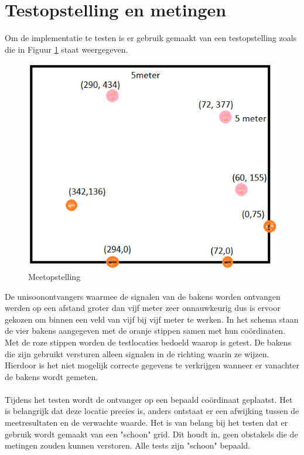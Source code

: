 \documentclass{article}
\begin{document}
\section{Testopstelling en metingen}
Om de implementatie te testen is er gebruik gemaakt van een testopstelling zoals die in Figuur \ref{Meetopstelling} staat weergegeven.
\begin{figure}[h] 
\centering\includegraphics[scale=0.5]{Meetopstelling.png}
\caption{Meetopstelling}
\label{Meetopstelling}
\end{figure}
De unisoonontvangers waarmee de signalen van de bakens worden ontvangen werden op een afstand groter dan vijf meter zeer onnauwkeurig dus is ervoor gekozen om binnen een veld van vijf bij vijf meter te werken. In het schema staan de vier bakens aangegeven met de oranje stippen samen met hun co\"{o}rdinaten. Met de roze stippen worden de testlocaties bedoeld waarop is getest. De bakens die zijn gebruikt versturen alleen signalen in de richting waarin ze wijzen. Hierdoor is het niet mogelijk correcte gegevens te verkrijgen wanneer er vanachter de bakens wordt gemeten. \\
\\
Tijdens het testen wordt de ontvanger op een bepaald co\"{o}rdinaat geplaatst. Het is belangrijk dat deze locatie precies is, anders ontstaat er een afwijking tussen de meetresultaten en de verwachte waarde. 
Het is van belang bij het testen dat er gebruik wordt gemaakt van een "schoon" grid. Dit houdt in, geen obstakels die de metingen zouden kunnen verstoren. Alle tests zijn "schoon"  bepaald. 
\end{document}
